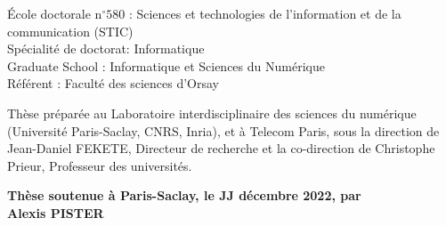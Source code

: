 \documentclass[12pt,a4paper, twoside]{book}
\begin{document}
\begin{titlepage}
        \vspace{6mm}

        \small École doctorale n$^{\circ}580$ : Sciences et technologies de l’information et de la communication (STIC)\\
        \small Spécialité de doctorat: Informatique\\
        \small Graduate School : Informatique et Sciences du Numérique\\
        \small Référent : Faculté des sciences d’Orsay \\
        \vspace{6mm}


        \footnotesize Thèse préparée au Laboratoire interdisciplinaire des sciences du numérique (Université Paris-Saclay, CNRS, Inria), et à Telecom Paris, sous la direction de Jean-Daniel FEKETE, Directeur de recherche et la co-direction de Christophe Prieur, Professeur des universités. \\

        \vspace{15mm}

        \textbf{Thèse soutenue à Paris-Saclay, le JJ décembre 2022, par}\\
        \bigskip
        \Large {\color{Prune} \textbf{Alexis PISTER}} %

        \vspace{\fill} %

        \bigskip


\end{titlepage}
\end{document}
